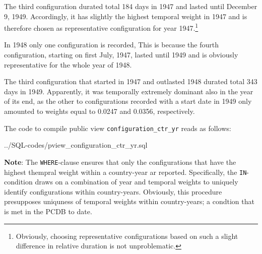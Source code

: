 The third configuration durated total 184 days in 1947 and lasted until December 9, 1949. Accordingly, it has slightly the highest temporal weight in 1947 and is therefore chosen as representative configuration for year 1947.\footnote{Obviously, choosing representative configurations based on such a slight difference in relative duration is not unproblematic.}

In 1948 only one configuration is recorded, This is because the fourth configuration, starting on first July, 1947, lasted until 1949 and is obviously representative for the whole year of 1948. 

The third configuration that started in 1947 and outlasted 1948 durated total 343 days in 1949. Apparently, it was temporally extremely dominant also in the year of its end, as the other to configurations recorded with a start date in 1949 only amounted to weights equal to 0.0247 and 0.0356, respectively.

The code to compile public view \texttt{\footnotesize configuration\_ctr\_yr} reads as follows:

%
{../SQL-codes/pview_configuration_ctr_yr.sql}

{\bf Note}: The \texttt{\footnotesize WHERE}-clause ensures that only the configurations that have the highest thempral weight within a country-year ar reported. Specifically, the \texttt{\footnotesize IN}-condition draws on a combination of year and temporal weights to uniquely identify configurations within country-years. Obviously, this procedure presupposes uniquness of temporal weights within country-years; a condtion that is met in the PCDB to date.




